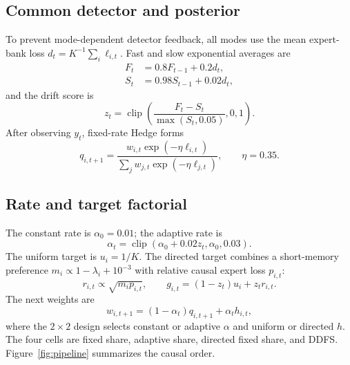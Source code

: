 \documentclass[10pt]{article}
\newcommand{\ddfs}{\textsc{DDFS}}
\begin{document}
\subsection{Common detector and posterior}

To prevent mode-dependent detector feedback, all modes use the mean expert-bank loss
$d_t=K^{-1}\sum_i\ell_{i,t}$. Fast and slow exponential averages are
\begin{align}
  F_t &= 0.8F_{t-1}+0.2d_t,\\
  S_t &= 0.98S_{t-1}+0.02d_t,
\end{align}
and the drift score is
\begin{equation}
  z_t=\operatorname{clip}\left(
  \frac{F_t-S_t}{\max(S_t,0.05)},0,1\right).
\end{equation}
After observing $y_t$, fixed-rate Hedge forms
\begin{equation}
  q_{i,t+1}=
  \frac{w_{i,t}\exp(-\eta\ell_{i,t})}
       {\sum_jw_{j,t}\exp(-\eta\ell_{j,t})},
  \qquad \eta=0.35.
\end{equation}

\subsection{Rate and target factorial}

The constant rate is $\alpha_0=0.01$; the adaptive rate is
\begin{equation}
  \alpha_t=\operatorname{clip}(\alpha_0+0.02z_t,\alpha_0,0.03).
\end{equation}
The uniform target is $u_i=1/K$. The directed target combines a short-memory
preference $m_i\propto 1-\lambda_i+10^{-3}$ with relative causal expert loss
$p_{i,t}$:
\begin{equation}
  r_{i,t}\propto\sqrt{m_ip_{i,t}},\qquad
  g_{i,t}=(1-z_t)u_i+z_tr_{i,t}.
\end{equation}
The next weights are
\begin{equation}
  w_{i,t+1}=(1-\alpha_t)q_{i,t+1}+\alpha_th_{i,t},
\end{equation}
where the $2\times2$ design selects constant or adaptive $\alpha$ and uniform or
directed $h$. The four cells are fixed share, adaptive share, directed fixed share,
and \ddfs. Figure~\ref{fig:pipeline} summarizes the causal order.
\end{document}
